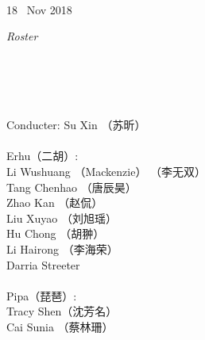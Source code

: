 \documentclass[letter,6pt,poets]{ConcProg}
\begin{document}
\begin{spacing}{1.0}
\begin{programme}{
\\  {\normalsize 18 ~Nov 2018}
}
\begin{part}[]
%

  \end{part}
  
  
\end{programme}

\begin{center}
\Large\textsl{ Roster}
\end{center}
\begin{multicols}{2}%

\\
\\
\\

\\
Conducter: Su Xin  （苏昕）
\\
\\
 Erhu（二胡）:                 \\
Li Wushuang （Mackenzie） （李无双）   \\
Tang Chenhao  （唐辰昊） \\
Zhao Kan （赵侃）\\
Liu Xuyao  （刘旭瑶）\\
Hu Chong （胡翀）\\
Li Hairong （李海荣）\\
Darria Streeter\\
\\
Pipa（琵琶）:\\
Tracy Shen（沈芳名）\\
Cai Sunia （蔡林珊）\\


\end{multicols}
\end{spacing}
\end{document}
